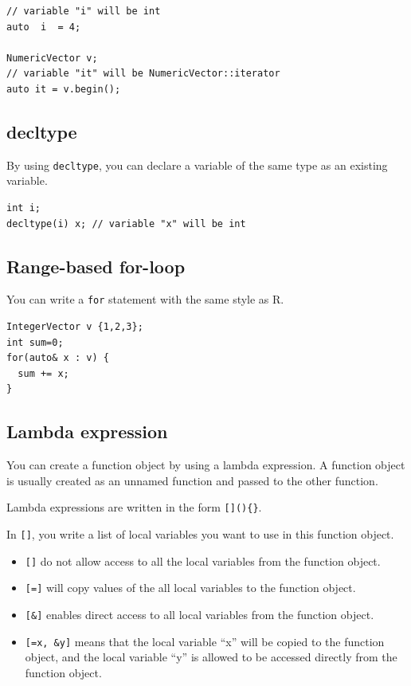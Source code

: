 \documentclass[]{book}
\providecommand{\tightlist}{%
  \setlength{\itemsep}{0pt}\setlength{\parskip}{0pt}}
\begin{document}
\begin{verbatim}
// variable "i" will be int
auto  i  = 4;

NumericVector v;
// variable "it" will be NumericVector::iterator
auto it = v.begin();
\end{verbatim}

\hypertarget{decltype}{%
\subsection{decltype}\label{decltype}}

By using \texttt{decltype}, you can declare a variable of the same type as an existing variable.

\begin{verbatim}
int i;
decltype(i) x; // variable "x" will be int
\end{verbatim}

\hypertarget{range-based-for-loop}{%
\subsection{Range-based for-loop}\label{range-based-for-loop}}

You can write a \texttt{for} statement with the same style as R.

\begin{verbatim}
IntegerVector v {1,2,3};
int sum=0;
for(auto& x : v) {
  sum += x;
}
\end{verbatim}

\hypertarget{lambda-expression}{%
\subsection{Lambda expression}\label{lambda-expression}}

You can create a function object by using a lambda expression. A function object is usually created as an unnamed function and passed to the other function.

Lambda expressions are written in the form \texttt{{[}{]}()\{\}}.

In \texttt{{[}{]}}, you write a list of local variables you want to use in this function object.

\begin{itemize}
\tightlist
\item
  \texttt{{[}{]}} do not allow access to all the local variables from the function object.
\item
  \texttt{{[}={]}} will copy values of the all local variables to the function object.
\item
  \texttt{{[}\&{]}} enables direct access to all local variables from the function object.
\item
  \texttt{{[}=x,\ \&y{]}} means that the local variable ``x'' will be copied to the function object, and the local variable ``y'' is allowed to be accessed directly from the function object.
\end{itemize}
\end{document}

